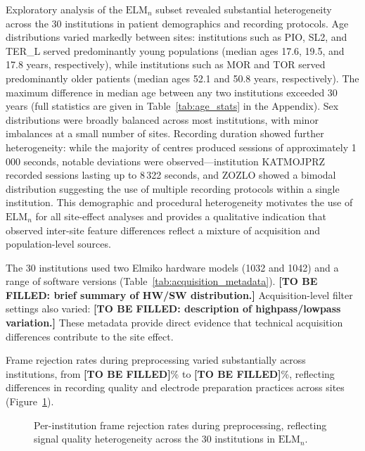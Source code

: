 \documentclass[preprint,12pt]{elsarticle}
\begin{document}
Exploratory analysis of the $\mathrm{ELM}_n$ subset revealed
substantial heterogeneity across the 30 institutions in patient
demographics and recording protocols.
Age distributions varied markedly between sites: institutions such as
PIO, SL2, and TER\_L served predominantly young populations (median
ages 17.6, 19.5, and 17.8 years, respectively), while institutions
such as MOR and TOR served predominantly older patients (median ages
52.1 and 50.8 years, respectively).
The maximum difference in median age between any two institutions
exceeded 30 years (full statistics are given in
Table~\ref{tab:age_stats} in the Appendix).
Sex distributions were broadly balanced across most institutions,
with minor imbalances at a small number of sites.
Recording duration showed further heterogeneity: while the majority
of centres produced sessions of approximately 1\,000 seconds, notable
deviations were observed---institution KATMOJPRZ recorded sessions
lasting up to 8\,322 seconds, and ZOZLO showed a bimodal distribution
suggesting the use of multiple recording protocols within a single
institution.
This demographic and procedural heterogeneity motivates the use of
$\mathrm{ELM}_n$ for all site-effect analyses and provides a
qualitative indication that observed inter-site feature differences
reflect a mixture of acquisition and population-level sources.

The 30 institutions used two Elmiko hardware models (1032 and 1042)
and a range of software versions
(Table~\ref{tab:acquisition_metadata}).
\textbf{[TO BE FILLED: brief summary of HW/SW distribution.]}
Acquisition-level filter settings also varied:
\textbf{[TO BE FILLED: description of highpass/lowpass variation.]}
These metadata provide direct evidence that technical acquisition
differences contribute to the site effect.

Frame rejection rates during preprocessing varied substantially
across institutions, from \textbf{[TO BE FILLED]}\% to
\textbf{[TO BE FILLED]}\%, reflecting differences in recording
quality and electrode preparation practices across sites
(Figure~\ref{fig:rejection_rates}).

\begin{figure}[htbp]
  \centering
  \caption{Per-institution frame rejection rates during
    preprocessing, reflecting signal quality heterogeneity across
    the 30 institutions in $\mathrm{ELM}_n$.}
  \label{fig:rejection_rates}
\end{figure}
\end{document}
